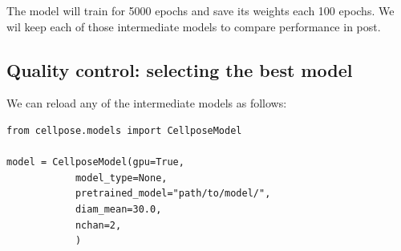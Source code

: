 \documentclass[tikz,10pt,a4paper]{article}
\begin{document}
	The model will train for 5000 epochs and save its weights each 100 epochs. We wil keep each of those intermediate models to compare performance in post.
	
	\subsection{Quality control: selecting the best model}
	
	We can reload any of the intermediate models as follows:
	
	\begin{verbatim}
from cellpose.models import CellposeModel

model = CellposeModel(gpu=True, 
		    model_type=None, 
		    pretrained_model="path/to/model/",
		    diam_mean=30.0, 
		    nchan=2,
		    )
	\end{verbatim}

	
\end{document}
